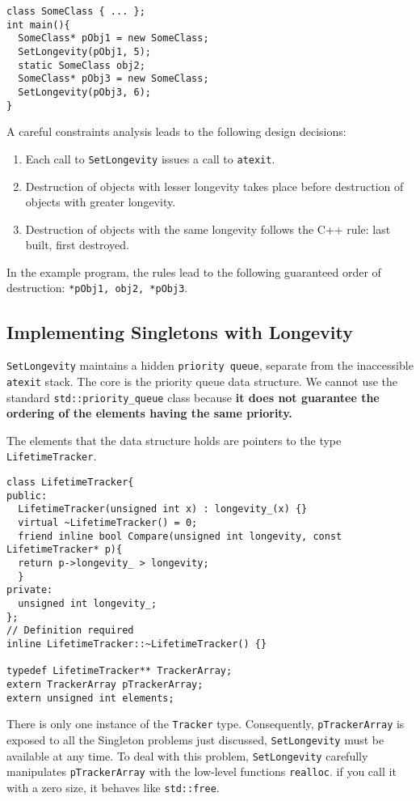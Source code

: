 \begin{verbatim}
class SomeClass { ... };
int main(){
  SomeClass* pObj1 = new SomeClass;
  SetLongevity(pObj1, 5);
  static SomeClass obj2;
  SomeClass* pObj3 = new SomeClass;
  SetLongevity(pObj3, 6);
}
\end{verbatim}
A careful constraints analysis leads to the following design
decisions:
\begin{enumerate}
\item Each call to \texttt{SetLongevity} issues a call to
  \texttt{atexit}.
\item Destruction of objects with lesser longevity takes place before
  destruction of objects with greater longevity.
\item Destruction of objects with the same longevity follows the C++
  rule: last built, first destroyed. 
\end{enumerate}

In the example program, the rules lead to the following guaranteed
order of destruction: \texttt{*pObj1, obj2, *pObj3}.

\subsection{Implementing Singletons with Longevity}

\texttt{SetLongevity} maintains a hidden \texttt{priority queue},
separate from the inaccessible \texttt{atexit} stack. The core is the
priority queue data structure. We cannot use the standard
\texttt{std::priority\_queue} class because \textbf{it does not
  guarantee the ordering of the elements having the same priority.}

The elements that the data structure holds are pointers to the type
\texttt{LifetimeTracker}.
\begin{verbatim}
class LifetimeTracker{
public:
  LifetimeTracker(unsigned int x) : longevity_(x) {}
  virtual ~LifetimeTracker() = 0;
  friend inline bool Compare(unsigned int longevity, const LifetimeTracker* p){
  return p->longevity_ > longevity;
  }
private:
  unsigned int longevity_;
};
// Definition required
inline LifetimeTracker::~LifetimeTracker() {}

typedef LifetimeTracker** TrackerArray;
extern TrackerArray pTrackerArray;
extern unsigned int elements;
\end{verbatim}

There is only one instance of the \texttt{Tracker} type. Consequently,
\texttt{pTrackerArray} is exposed to all the Singleton problems just
discussed, \texttt{SetLongevity} must be available at any time. To
deal with this problem, \texttt{SetLongevity} carefully 
manipulates \texttt{pTrackerArray} with the low-level functions
\texttt{realloc}. if you call it with a zero size, it behaves like
\texttt{std::free}.

